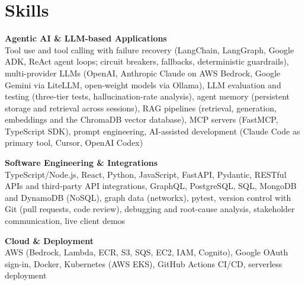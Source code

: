 \documentclass[a4paper,11pt]{article}
\newcommand{\skillgroup}[2]{{\color{headernavy}\textbf{#1}}\\ #2\par\vspace{3pt}}
\begin{document}
\section{Skills}
\skillgroup{Agentic AI \& LLM-based Applications}{Tool use and tool calling with failure recovery (LangChain, LangGraph, Google ADK, ReAct agent loops; circuit breakers, fallbacks, deterministic guardrails), multi-provider LLMs (OpenAI, Anthropic Claude on AWS Bedrock, Google Gemini via LiteLLM, open-weight models via Ollama), LLM evaluation and testing (three-tier tests, hallucination-rate analysis), agent memory (persistent storage and retrieval across sessions), RAG pipelines (retrieval, generation, embeddings and the ChromaDB vector database), MCP servers (FastMCP, TypeScript SDK), prompt engineering, AI-assisted development (Claude Code as primary tool, Cursor, OpenAI Codex)}
\skillgroup{Software Engineering \& Integrations}{TypeScript/Node.js, React, Python, JavaScript, FastAPI, Pydantic, RESTful APIs and third-party API integrations, GraphQL, PostgreSQL, SQL, MongoDB and DynamoDB (NoSQL), graph data (networkx), pytest, version control with Git (pull requests, code review), debugging and root-cause analysis, stakeholder communication, live client demos}
\skillgroup{Cloud \& Deployment}{AWS (Bedrock, Lambda, ECR, S3, SQS, EC2, IAM, Cognito), Google OAuth sign-in, Docker, Kubernetes (AWS EKS), GitHub Actions CI/CD, serverless deployment}
\end{document}
